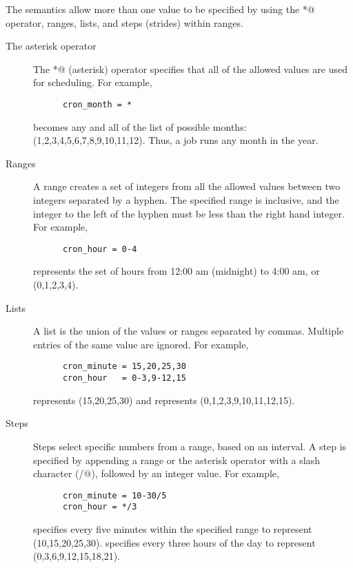 The semantics allow more than one value to be specified 
by using the \verb@*@ operator,
ranges, lists, and steps (strides) within ranges.

\begin{description}
   \item[The asterisk operator]
   The \verb@*@ (asterisk) operator specifies that all of the 
   allowed values are used for scheduling.
   For example,
   \begin{verbatim}
      cron_month = *
   \end{verbatim}
   becomes any and all of the list of possible months:
   (1,2,3,4,5,6,7,8,9,10,11,12).
   Thus, a job runs any month in the year.

   \item[Ranges]
   A range creates a set of integers from all the allowed values between two
   integers separated by a hyphen. The specified range is inclusive, and the
   integer to the left of the hyphen must be less than the right hand integer.
   For example,
   \begin{verbatim}
      cron_hour = 0-4
   \end{verbatim}
   represents the set of
   hours from 12:00 am (midnight) to 4:00 am, or (0,1,2,3,4).
   
   \item[Lists]
   A list is the union of the values or ranges separated by commas. Multiple
   entries of the same value are ignored. 
   For example,
   \begin{verbatim}
      cron_minute = 15,20,25,30
      cron_hour   = 0-3,9-12,15
   \end{verbatim}
    represents (15,20,25,30)
   and  represents (0,1,2,3,9,10,11,12,15).
      
   \item[Steps]
   Steps select specific numbers from a range, based on an interval.
   A step is specified by appending a range or the asterisk
   operator with a slash character (\verb@/@),
   followed by an integer value.
   For example,
   \begin{verbatim}
      cron_minute = 10-30/5
      cron_hour = */3
   \end{verbatim}
    specifies
   every five minutes within the specified range 
   to represent (10,15,20,25,30).
    specifies every three hours of the day
   to represent (0,3,6,9,12,15,18,21).
   

\end{description}

